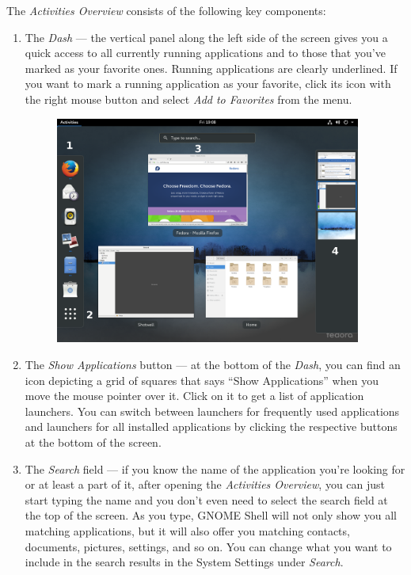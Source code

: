 The \emph{Activities Overview} consists of the following key components:
\begin{enumerate}
\item The \emph{Dash} --- the vertical panel along the left side of the screen gives you a quick access to all currently running applications and to those that you've marked as your favorite ones. Running applications are clearly underlined. If you want to mark a running application as your favorite, click its icon with the right mouse button and select \emph{Add to Favorites} from the menu.

\begin{figure}[t]
\begin{center}
\includegraphics[width=0.95\textwidth]{img/shell-b}
 \label{fig:shell-b}
\end{center}
\end{figure}

\item The \emph{Show Applications} button --- at the bottom of the \emph{Dash}, you can find an icon depicting a grid of squares that says \enquote{Show Applications} when you move the mouse pointer over it. Click on it to get a list of application launchers. You can switch between launchers for frequently used applications and launchers for all installed applications by clicking the respective buttons at the bottom of the screen.

\item The \emph{Search} field --- if you know the name of the application you're looking for or at least a part of it, after opening the \emph{Activities Overview}, you can just start typing the name and you don't even need to select the search field at the top of the screen. As you type, GNOME Shell will not only show you all matching applications, but it will also offer you matching contacts, documents, pictures, settings, and so on. You can change what you want to include in the search results in the System Settings under \emph{Search}.


\end{enumerate}
